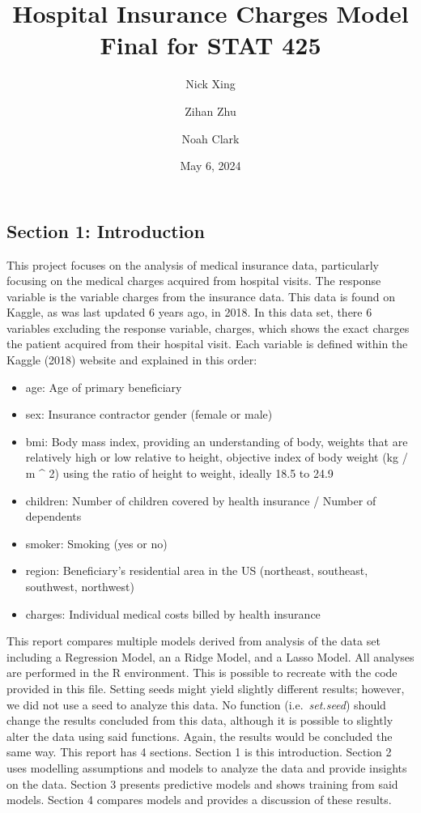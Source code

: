 \documentclass[
  12pt,
]{article}
\title{Hospital Insurance Charges Model \vspace{0.5cm}\\
Final for STAT 425}
\author{Nick Xing \and Zihan Zhu \and Noah Clark}
\date{May 6, 2024}
\begin{document}
\maketitle

{
\setcounter{tocdepth}{3}
\tableofcontents
}
\newpage

\subsection{Section 1: Introduction}\label{section-1-introduction}

This project focuses on the analysis of medical insurance data,
particularly focusing on the medical charges acquired from hospital
visits. The response variable is the variable charges from the insurance
data. This data is found on Kaggle, as was last updated 6 years ago, in
2018. In this data set, there 6 variables excluding the response
variable, charges, which shows the exact charges the patient acquired
from their hospital visit. Each variable is defined within the Kaggle
(2018) website and explained in this order:

\begin{itemize}
\item
  age: Age of primary beneficiary
\item
  sex: Insurance contractor gender (female or male)
\item
  bmi: Body mass index, providing an understanding of body, weights that
  are relatively high or low relative to height, objective index of body
  weight (kg / m \^{} 2) using the ratio of height to weight, ideally
  18.5 to 24.9
\item
  children: Number of children covered by health insurance / Number of
  dependents
\item
  smoker: Smoking (yes or no)
\item
  region: Beneficiary's residential area in the US (northeast,
  southeast, southwest, northwest)
\item
  charges: Individual medical costs billed by health insurance
\end{itemize}

This report compares multiple models derived from analysis of the data
set including a Regression Model, an a Ridge Model, and a Lasso Model.
All analyses are performed in the R environment. This is possible to
recreate with the code provided in this file. Setting seeds might yield
slightly different results; however, we did not use a seed to analyze
this data. No function (i.e.~\emph{set.seed}) should change the results
concluded from this data, although it is possible to slightly alter the
data using said functions. Again, the results would be concluded the
same way. This report has 4 sections. Section 1 is this introduction.
Section 2 uses modelling assumptions and models to analyze the data and
provide insights on the data. Section 3 presents predictive models and
shows training from said models. Section 4 compares models and provides
a discussion of these results.
\end{document}
